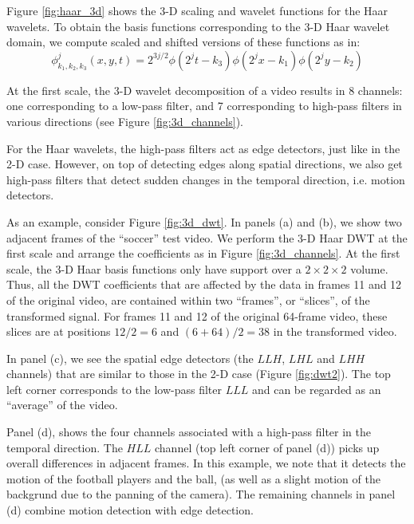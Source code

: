 Figure \ref{fig:haar_3d} shows the 3-D scaling and wavelet functions for the Haar wavelets.
To obtain the basis functions corresponding to the 3-D Haar wavelet domain, we compute scaled and shifted versions of these functions as in:%
\begin{equation*}
  \phi_{k_1,k_2,k_3}^j(x,y,t) = 2^{3j/2} \phi(2^j t - k_3)\phi(2^j x - k_1) \phi(2^j y - k_2)
\end{equation*}

At the first scale, the 3-D wavelet decomposition of a video results in 8 channels: one corresponding to a low-pass filter, and 7 corresponding to high-pass filters in various directions (see Figure \ref{fig:3d_channels}).

For the Haar wavelets, the high-pass filters act as edge detectors, just like in the 2-D case. 
However, on top of detecting edges along spatial directions, we also get high-pass filters that detect sudden changes in the temporal direction, i.e. motion detectors.

As an example, consider Figure \ref{fig:3d_dwt}.
In panels (a) and (b), we show two adjacent frames of the ``soccer'' test video.
We perform the 3-D Haar DWT at the first scale and arrange the coefficients as in Figure \ref{fig:3d_channels}.
At the first scale, the 3-D Haar basis functions only have support over a $2\times 2\times 2$ volume.
Thus, all the DWT coefficients that are affected by the data in frames 11 and 12 of the original video, are contained within two ``frames'', or ``slices'', of the transformed signal.
For frames 11 and 12 of the original 64-frame video, these slices are at positions $12/2=6$ and $(6+64)/2=38$ in the transformed video.

In panel (c), we see the spatial edge detectors (the $LLH$, $LHL$ and $LHH$ channels) that are similar to those in the 2-D case (Figure \ref{fig:dwt2}).
The top left corner corresponds to the low-pass filter $LLL$ and can be regarded as an ``average'' of the video.

Panel (d), shows the four channels associated with a high-pass filter in the temporal direction.
The $HLL$ channel (top left corner of panel (d)) picks up overall differences in adjacent frames.
In this example, we note that it detects the motion of the football players and the ball, (as well as a slight motion of the backgrund due to the panning of the camera).
The remaining channels in panel (d) combine motion detection with edge detection.

